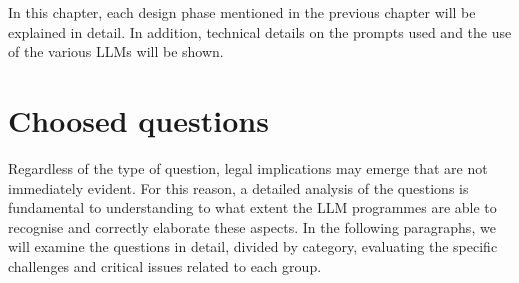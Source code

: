 In this chapter, each design phase mentioned in the previous chapter will be explained in detail. In addition, technical details on the prompts used and the use of the various LLMs will be shown.
\section{Choosed questions}
Regardless of the type of question, legal implications may emerge that are not immediately evident. For this reason, a detailed analysis of the questions is fundamental to understanding to what extent the LLM programmes are able to recognise and correctly elaborate these aspects. In the following paragraphs, we will examine the questions in detail, divided by category, evaluating the specific challenges and critical issues related to each group.
